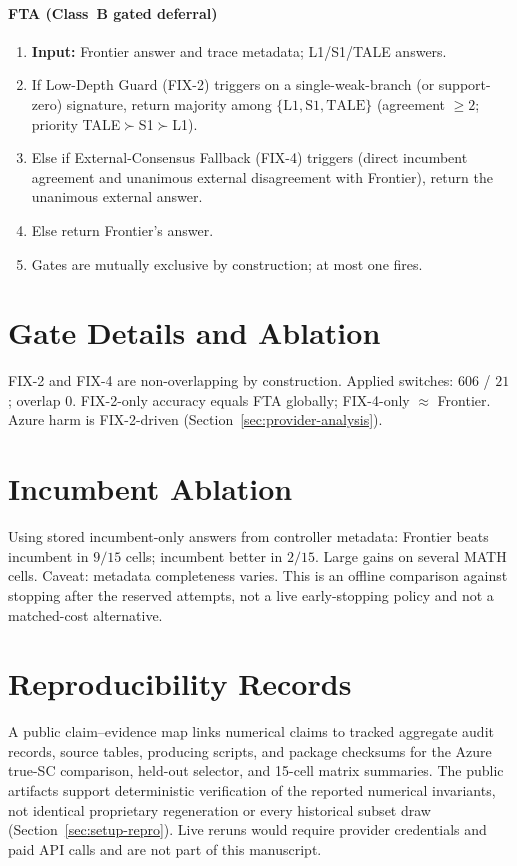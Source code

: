 \paragraph{FTA (Class~B gated deferral)}
\begin{enumerate}
\item \textbf{Input:} Frontier answer and trace metadata; L1/S1/TALE answers.
\item If Low-Depth Guard (FIX-2) triggers on a single-weak-branch (or support-zero) signature,
return majority among $\{\mathrm{L1},\mathrm{S1},\mathrm{TALE}\}$ (agreement $\geq 2$; priority
TALE$\succ$S1$\succ$L1).
\item Else if External-Consensus Fallback (FIX-4) triggers
(direct incumbent agreement and unanimous external disagreement with Frontier), return the
unanimous external answer.
\item Else return Frontier's answer.
\item Gates are mutually exclusive by construction; at most one fires.
\end{enumerate}

\section{Gate Details and Ablation}
\label{app:gates}

FIX-2 and FIX-4 are non-overlapping by construction. Applied switches: $606$ / $21$; overlap $0$.
FIX-2-only accuracy equals FTA globally; FIX-4-only $\approx$ Frontier. Azure harm is FIX-2-driven
(Section~\ref{sec:provider-analysis}).

\section{Incumbent Ablation}
\label{app:incumbent}

Using stored incumbent-only answers from controller metadata: Frontier beats incumbent in $9/15$
cells; incumbent better in $2/15$. Large gains on several MATH cells. Caveat: metadata completeness
varies. This is an offline comparison against stopping after the reserved attempts, not a live
early-stopping policy and not a matched-cost alternative.

\section{Reproducibility Records}
\label{app:artifact-map}

A public claim--evidence map links numerical claims to tracked aggregate audit records, source
tables, producing scripts, and package checksums for the Azure true-SC comparison, held-out selector,
and 15-cell matrix summaries. The public artifacts support deterministic verification of the
reported numerical invariants, not identical proprietary regeneration or every historical subset draw
(Section~\ref{sec:setup-repro}). Live reruns would require provider credentials and paid API calls
and are not part of this manuscript.

